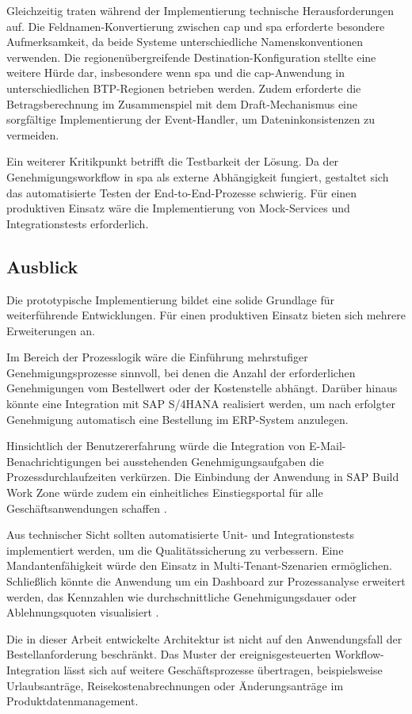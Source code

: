 Gleichzeitig traten während der Implementierung technische Herausforderungen auf. Die Feldnamen-Konvertierung zwischen \gls{cap} und \gls{spa} erforderte besondere Aufmerksamkeit, da beide Systeme unterschiedliche Namenskonventionen verwenden. Die regionenübergreifende Destination-Konfiguration stellte eine weitere Hürde dar, insbesondere wenn \gls{spa} und die \gls{cap}-Anwendung in unterschiedlichen BTP-Regionen betrieben werden. Zudem erforderte die Betragsberechnung im Zusammenspiel mit dem Draft-Mechanismus eine sorgfältige Implementierung der Event-Handler, um Dateninkonsistenzen zu vermeiden.

Ein weiterer Kritikpunkt betrifft die Testbarkeit der Lösung. Da der Genehmigungsworkflow in \gls{spa} als externe Abhängigkeit fungiert, gestaltet sich das automatisierte Testen der End-to-End-Prozesse schwierig. Für einen produktiven Einsatz wäre die Implementierung von Mock-Services und Integrationstests erforderlich.

\subsection{Ausblick}

Die prototypische Implementierung bildet eine solide Grundlage für weiterführende Entwicklungen. Für einen produktiven Einsatz bieten sich mehrere Erweiterungen an.

Im Bereich der Prozesslogik wäre die Einführung mehrstufiger Genehmigungsprozesse sinnvoll, bei denen die Anzahl der erforderlichen Genehmigungen vom Bestellwert oder der Kostenstelle abhängt. Darüber hinaus könnte eine Integration mit SAP S/4HANA realisiert werden, um nach erfolgter Genehmigung automatisch eine Bestellung im ERP-System anzulegen.

Hinsichtlich der Benutzererfahrung würde die Integration von E-Mail-Benachrichtigungen bei ausstehenden Genehmigungsaufgaben die Prozessdurchlaufzeiten verkürzen. Die Einbindung der Anwendung in SAP Build Work Zone würde zudem ein einheitliches Einstiegsportal für alle Geschäftsanwendungen schaffen \citep{sap2024btpguide}.

Aus technischer Sicht sollten automatisierte Unit- und Integrationstests implementiert werden, um die Qualitätssicherung zu verbessern. Eine Mandantenfähigkeit würde den Einsatz in Multi-Tenant-Szenarien ermöglichen. Schließlich könnte die Anwendung um ein Dashboard zur Prozessanalyse erweitert werden, das Kennzahlen wie durchschnittliche Genehmigungsdauer oder Ablehnungsquoten visualisiert \citep{kratzke2021cloud}.

Die in dieser Arbeit entwickelte Architektur ist nicht auf den Anwendungsfall der Bestellanforderung beschränkt. Das Muster der ereignisgesteuerten Workflow-Integration lässt sich auf weitere Geschäftsprozesse übertragen, beispielsweise Urlaubsanträge, Reisekostenabrechnungen oder Änderungsanträge im Produktdatenmanagement.
